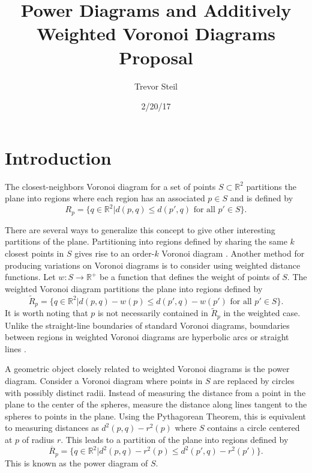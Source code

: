 \documentclass[a4paper]{article}
\title{Power Diagrams and Additively Weighted Voronoi Diagrams Proposal}
\date{2/20/17}
\author{Trevor Steil}
\newcommand{\R}{\mathbb{R}}
\begin{document}
\maketitle

\section{Introduction}

The closest-neighbors Voronoi diagram for a set of points $S \subset \R^2$ partitions the plane into regions where each region has an associated $p \in S$ and
is defined by
\begin{equation*}
  R_p = \{ q \in \R^2 | d(p,q) \leq d(p',q) \text{ for all } p' \in S \} .
\end{equation*}

There are several ways to generalize this concept to give other interesting partitions of the plane. Partitioning into regions defined by sharing the
same $k$ closest points in $S$ gives rise to an order-$k$ Voronoi diagram \cite{aurenhammer_survey}. Another method for producing variations on
Voronoi diagrams is to consider using weighted distance functions. Let $w: S \to \R^+$ be a function that defines the weight of points of $S$. The
weighted Voronoi diagram partitions the plane into regions defined by
\begin{equation*}
  \tilde{R}_p = \{ q \in \R^2 | d(p,q) - w(p) \leq d(p',q) - w(p') \text{ for all } p' \in S \}.
\end{equation*}
It is worth noting that $p$ is not necessarily contained in $\tilde{R}_p$ in the weighted case. Unlike the straight-line boundaries of standard
Voronoi diagrams, boundaries between regions in weighted Voronoi diagrams are hyperbolic arcs or straight lines \cite{aurenhammer_additive}.

A geometric object closely related to weighted Voronoi diagrams is the power diagram. Consider a Voronoi diagram where points in $S$ are replaced by
circles with possibly distinct radii. Instead of measuring the distance from a point in the plane to the center of the spheres, measure the distance
along lines tangent to the spheres to points in the plane. Using the Pythagorean Theorem, this is equivalent to measuring distances as $d^2(p,q) -
r^2(p)$ where $S$ contains a circle centered at $p$ of radius $r$. This leads to a partition of the plane into regions defined by
\begin{equation*}
  \overline{R}_p = \{ q \in \R^2 | d^2(p,q) - r^2(p) \leq d^2(p',q) - r^2(p') \}.
\end{equation*}
This is known as the power diagram of $S$.
\end{document}
